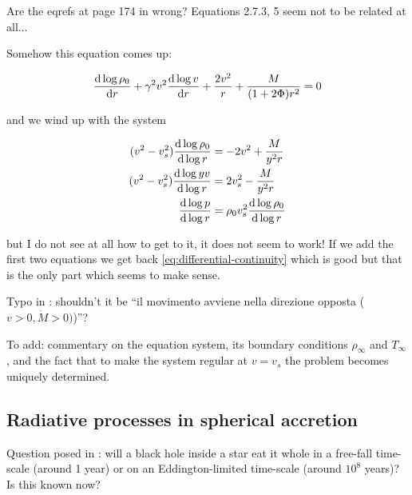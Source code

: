\documentclass[main.tex]{subfiles}
\begin{document}
\begin{greenbox}
  Are the eqrefs at page 174 in \cite{Nobili:2000} wrong? Equations 2.7.3, 5 seem not to be related at all...

  Somehow this equation comes up:

  \begin{equation}
    \dv{\log \rho_0 }{r} + \gamma^2 v^2 \dv{\log v }{r}  + \frac{2 v^2}{r} + \frac{M}{(1+2 \Phi) r^2} = 0
  \end{equation}

  and we wind up with the system

  \begin{subequations}
  \begin{align}
    (v^2-v_s^2) \dv{\log \rho_0}{\log r} &= - 2v^2 + \frac{M}{y^2 r}  \\
    (v^2-v_s^2) \dv{\log yv }{\log r} &=  2v_s^2 - \frac{M}{y^2 r}  \\
    \dv{\log p }{\log r} &= \rho_0 v_s^2 \dv{\log \rho_0}{\log r }
  \end{align}
  \end{subequations}

  but I do not see at all how to get to it, it does not seem to work!
  If we add the first two equations we get back \eqref{eq:differential-continuity} which is good but that is the only part which seems to make sense.
\end{greenbox}

\begin{greenbox}
  Typo in \cite[page 175]{Nobili:2000}: shouldn't it be ``il movimento avviene nella direzione opposta (\(v>0, \dot{M}>0)\))''?
\end{greenbox}

\begin{greenbox}
  To add: commentary on the equation system, its boundary conditions \(\rho_\infty\) and \(T_\infty\), and the fact that to make the system regular at \(v = v_s\) the problem becomes uniquely determined.
\end{greenbox}

\subsection{Radiative processes in spherical accretion}

\begin{greenbox}
  Question posed in \cite[Introduction]{ThorneFLammmangZytkow:1981feb}: will a black hole inside a star eat it whole in a free-fall time-scale (around 1 year) or on an Eddington-limited time-scale (around \(10^8\) years)?
  Is this known now?
\end{greenbox}
\end{document}
